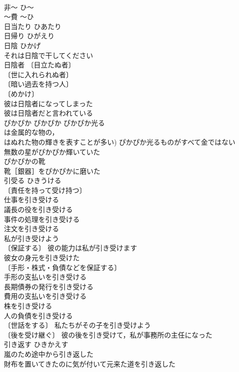\documentclass[8pt]{extreport}
\begin{document}
\begin{CJK}{UTF8}{min}
\\	非～	ひ～	
\\	～費	～ひ	
\\	日当たり	ひあたり	
\\	日帰り	ひがえり	
\\	日陰	ひかげ	
\\	それは日陰で干してください 
\\	日陰者 〔目立たぬ者〕
\\	〔世に入れられぬ者〕
\\	〔暗い過去を持つ人〕
\\	〔めかけ〕
\\	彼は日陰者になってしまった 
\\	彼は日陰者だと言われている 
\\	ぴかぴか	ぴかぴか	ぴかぴか光る 
\\	は金属的な物の，
\\	はぬれた物の輝きを表すことが多い) ぴかぴか光るものがすべて金ではない 
\\	無数の星がぴかぴか輝いていた 
\\	ぴかぴかの靴 
\\	靴［銀器］をぴかぴかに磨いた 
\\	引受る	ひきうける	
\\	〔責任を持って受け持つ〕
\\	仕事を引き受ける 
\\	議長の役を引き受ける 
\\	事件の処理を引き受ける 
\\	注文を引き受ける 
\\	私が引き受けよう 
\\	〔保証する〕 彼の能力は私が引き受けます 
\\	彼女の身元を引き受けた 
\\	〔手形・株式・負債などを保証する〕
\\	手形の支払いを引き受ける 
\\	長期債券の発行を引き受ける 
\\	費用の支払いを引き受ける 
\\	株を引き受ける 
\\	人の負債を引き受ける 
\\	〔世話をする〕 私たちがその子を引き受けよう 
\\	〔後を受け継ぐ〕 彼の後を引き受けて，私が事務所の主任になった 
\\	引き返す	ひきかえす	
\\	嵐のため途中から引き返した 
\\	財布を置いてきたのに気が付いて元来た道を引き返した 

\end{CJK}
\end{document}
